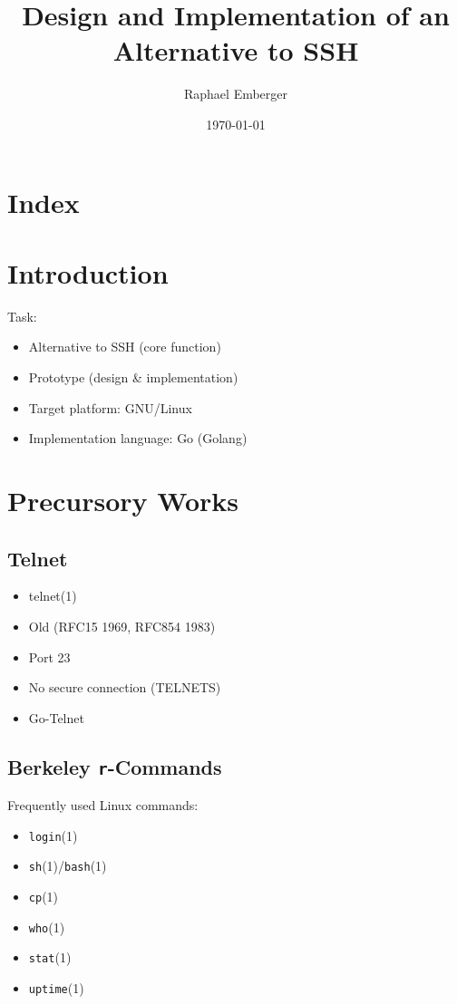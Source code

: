 \documentclass[
	xcolor=dvipsnames,
]{beamer}
\title{Design and Implementation of an Alternative to SSH}
\date{\today}
\author{Raphael Emberger}
\newenvironment{zhawframe}[1][]
{\begin{frame}[environment=fr,#1]{\insertsectionhead}{\insertsubsectionhead}}
{\end{frame}
}
\begin{document}
\maketitle

\section*{Index}
\begin{zhawframe}[shrink]
\begin{multicols}{2}
\tableofcontents
\end{multicols}
\end{zhawframe}

\section{Introduction}
\begin{zhawframe}
Task:
\begin{itemize}
\item<1-> Alternative to SSH (core function)
\item<2-> Prototype (design \& implementation)
\item<3-> Target platform: GNU/Linux
\item<4-> Implementation language: Go (Golang)
\end{itemize}
\end{zhawframe}

\section{Precursory Works}
\subsection{Telnet}
\begin{zhawframe}
\begin{itemize}
\item<1-> telnet(1)
\item<2-> Old (RFC15 1969, RFC854 1983)
\item<4-> Port 23
\item<5-> No secure connection (TELNETS)
\item<7-> Go-Telnet
\end{itemize}
\end{zhawframe}

\subsection{Berkeley \texttt{r}-Commands}
\begin{zhawframe}
Frequently used Linux commands:
\begin{itemize}
\item \texttt{login}(1)
\item \texttt{sh}(1)/\texttt{bash}(1)
\item \texttt{cp}(1)
\item \texttt{who}(1)
\item \texttt{stat}(1)
\item \texttt{uptime}(1)
\end{itemize}
\end{zhawframe}
\end{document}
